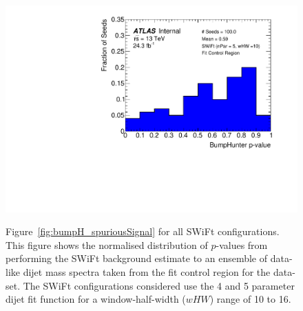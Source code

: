 \begin{figure}[!htb]
{}\hspace{-3mm}                                       
 {                                                    
  \includegraphics[width=0.32\linewidth, angle=0]{figs/Dibjet/LowMass/FitStudy_min566/pVal_bumpHunter_corrFitCR_5para_low10_high10.pdf}
}
\caption[Figure~\ref{fig:bumpH_spuriousSignal} for all SWiFt configurations.]
 {\label{fig:app-bumpH_spuriousSignal}
 Figure~\ref{fig:bumpH_spuriousSignal} for all SWiFt configurations.
  This figure shows the normalised distribution of \bh{} $p$-values from performing the SWiFt background estimate to an ensemble of
  data-like dijet mass spectra taken from the fit control region for the \lm{} data-set.
  The SWiFt configurations considered use the 4 and 5 parameter dijet fit function for a window-half-width ($wHW$) range of 10 to 16.
}
\end{figure}


